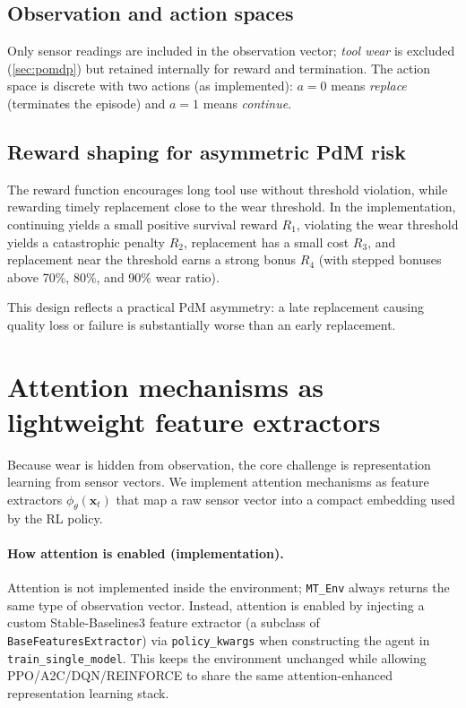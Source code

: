 \documentclass[11pt]{article}
\begin{document}
\subsection{Observation and action spaces}
Only sensor readings are included in the observation vector; \emph{tool wear} is excluded (\cref{sec:pomdp}) but retained internally for reward and termination. The action space is discrete with two actions (as implemented): $a=0$ means \emph{replace} (terminates the episode) and $a=1$ means \emph{continue}.

\subsection{Reward shaping for asymmetric PdM risk}
\label{sec:reward}
The reward function encourages long tool use without threshold violation, while rewarding timely replacement close to the wear threshold. In the implementation, continuing yields a small positive survival reward $R_1$, violating the wear threshold yields a catastrophic penalty $R_2$, replacement has a small cost $R_3$, and replacement near the threshold earns a strong bonus $R_4$ (with stepped bonuses above 70\%, 80\%, and 90\% wear ratio).

This design reflects a practical PdM asymmetry: a late replacement causing quality loss or failure is substantially worse than an early replacement.

\section{Attention mechanisms as lightweight feature extractors}
\label{sec:attention}
Because wear is hidden from observation, the core challenge is representation learning from sensor vectors. We implement attention mechanisms as feature extractors $\phi_\theta(\mathbf{x}_t)$ that map a raw sensor vector into a compact embedding used by the RL policy.

\paragraph{How attention is enabled (implementation).}
Attention is not implemented inside the environment; \texttt{MT\_Env} always returns the same type of observation vector. Instead, attention is enabled by injecting a custom Stable-Baselines3 feature extractor (a subclass of \texttt{BaseFeaturesExtractor}) via \texttt{policy\_kwargs} when constructing the agent in \texttt{train\_single\_model}. This keeps the environment unchanged while allowing PPO/A2C/DQN/REINFORCE to share the same attention-enhanced representation learning stack.
\end{document}
